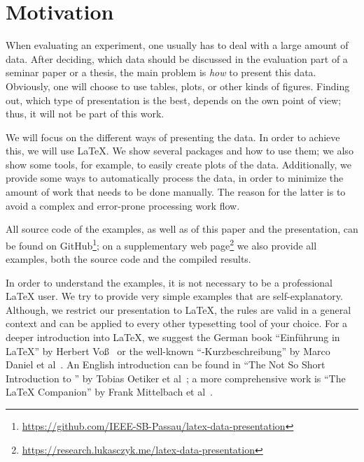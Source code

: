 \section{Motivation}

When evaluating an experiment, one usually has to deal with a large amount of
data.  After deciding, which data should be discussed in the evaluation part of
a seminar paper or a thesis, the main problem is \emph{how} to present this
data. Obviously, one will choose to use tables, plots, or other kinds of
figures.  Finding out, which type of presentation is the best, depends on the
own point of view; thus, it will not be part of this work.

We will focus on the different ways of presenting the data.  In order to achieve
this, we will use \LaTeX\@.  We show several packages and how to use them; we
also show some tools, for example, to easily create plots of the data.
Additionally, we provide some ways to automatically process the data, in order
to minimize the amount of work that needs to be done manually.  The reason for
the latter is to avoid a complex and error-prone processing work flow.

All source code of the examples, as well as of this paper and the presentation,
can be found on GitHub\footnote{\label{footnote-github}%
  \href{https://github.com/IEEE-SB-Passau/latex-data-presentation}%
    {https://github.com/IEEE-SB-Passau/latex-data-presentation}}; on a
supplementary web page\footnote{\label{footnote-webpage}%
  \href{https://research.lukasczyk.me/latex-data-presentation}%
    {https://research.lukasczyk.me/latex-data-presentation}} we also provide all
examples, both the source code and the compiled results.

In order to understand the examples, it is not necessary to be a professional
\LaTeX{} user.  We try to provide very simple examples that are
self-explanatory.  Although, we restrict our presentation to \LaTeX{}, the rules
are valid in a general context and can be applied to every other typesetting
tool of your choice.  For a deeper introduction into \LaTeX{}, we suggest the
German book \enquote{Einführung in \LaTeX} by Herbert Voß~\cite{Voss2012} or the
well-known \enquote{-Kurzbeschreibung} by Marco Daniel et
al~\cite{Daniel2015}.  An English introduction can be found in \enquote{The Not
So Short Introduction to } by Tobias Oetiker et
al~\cite{Oetiker2015}; a more comprehensive work is \enquote{The \LaTeX{}
Companion} by Frank Mittelbach et al~\cite{Mittelbach2008}.
